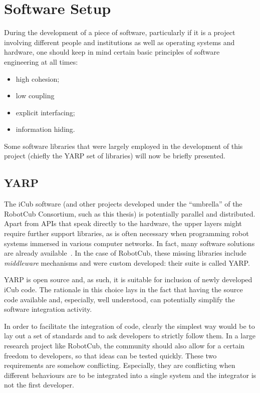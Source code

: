 \section{Software Setup}

During the development of a piece of software, particularly if it is a project involving different people and institutions as well as operating systems and hardware, one should keep in mind certain basic principles of software engineering at all times:
\begin{itemize}
\item high cohesion;

\item low coupling

\item explicit interfacing;

\item information hiding.
\end{itemize}

Some software libraries that were largely employed in the development of this project (chiefly the \acs{YARP} set of libraries) will now be briefly presented.

\subsection{YARP}
\label{sec:yarp} 

The iCub software (and other projects developed under the ``umbrella'' of the \ac{RobotCub} Consortium, such as this thesis) is potentially parallel and distributed. Apart from \acp{API} that speak directly to the hardware, the upper layers might require further support libraries, as is often necessary when programming robot systems immersed in various computer networks. In fact, many software solutions are already available~\cite[Table~1]{calisi:2008}. In the case of \ac{RobotCub}, these missing libraries include \emph{middleware} mechanisms and were custom developed: their suite is called \ac{YARP}.

\ac{YARP} is open source and, as such, it is suitable for inclusion of newly developed iCub code. The rationale in this choice lays in the fact that having the source code available and, especially, well understood, can potentially simplify the software integration activity.

In order to facilitate the integration of code, clearly the simplest way would be to lay out a set of standards and to ask developers to strictly follow them. In a large research project like \ac{RobotCub}, the community should also allow for a certain freedom to developers, so that ideas can be tested quickly. These two requirements are somehow conflicting. Especially, they are conflicting when different behaviours are to be integrated into a single system and the integrator is not the first developer.

